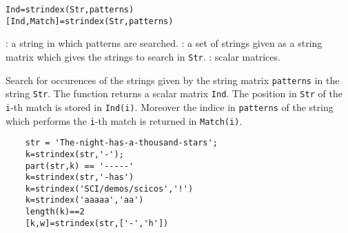 
\begin{mandesc}
\end{mandesc}
\begin{calling_sequence}
\begin{verbatim}
Ind=strindex(Str,patterns)
[Ind,Match]=strindex(Str,patterns)
\end{verbatim}
\end{calling_sequence}

\begin{parameters}
  \begin{varlist}
    : a string in which patterns are searched.
    : a set of strings given as a string matrix which gives the 
    strings to search in \verb!Str!.
    : scalar matrices.
  \end{varlist}
\end{parameters}

\begin{mandescription}
Search for occurences of the strings given by the string matrix \verb!patterns! 
in the string \verb!Str!. The function returns a scalar matrix \verb!Ind!.
The position in \verb!Str! of the \verb+i+-th match is stored in \verb+Ind(i)+.
Moreover the indice in \verb!patterns! of the string which performs the \verb+i+-th 
match is returned in  \verb+Match(i)+.
\end{mandescription}
\begin{examples}
  \begin{Verbatim}
    str = 'The-night-has-a-thousand-stars';
    k=strindex(str,'-');
    part(str,k) == '-----' 
    k=strindex(str,'-has') 
    k=strindex('SCI/demos/scicos','!')
    k=strindex('aaaaa','aa')
    length(k)==2 
    [k,w]=strindex(str,['-','h'])
  \end{Verbatim}
\end{examples}
\begin{manseealso}
     
\end{manseealso}
